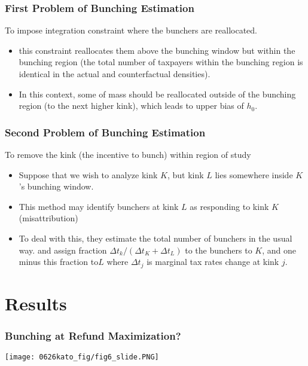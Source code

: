 \documentclass[unicode,12pt]{beamer}
\begin{document}
    \begin{frame}
        \frametitle{First Problem of Bunching Estimation}
    
        To impose integration constraint where the bunchers are reallocated.
        \begin{itemize}
            \item this constraint reallocates them above the bunching window but within the bunching region (the total number of taxpayers within the bunching region is identical in the actual and counterfactual densities).
            \item In this context, some of mass should be reallocated outside of the bunching region (to the next higher kink), which leads to upper bias of $h_0$.
        \end{itemize}
    
    \end{frame}

    \begin{frame}
        \frametitle{Second Problem of Bunching Estimation}
    
        To remove the kink (the incentive to bunch) within region of study 
        \begin{itemize}
            \item Suppose that we wish to analyze kink $K$, but kink $L$ lies somewhere inside $K$'s bunching window.
            \item This method may identify bunchers at kink $L$ as responding to kink $K$ (misattribution)
            \item To deal with this, they estimate the total number of bunchers in the usual way. and assign fraction $\Delta t_k/(\Delta t_K + \Delta t_L)$ to the bunchers to $K$, and one minus this fraction to$L$ where $\Delta t_j$ is marginal tax rates change at kink $j$.  
        \end{itemize}
    
    \end{frame}

    
    \section{Results}

    \begin{frame}
        \frametitle{Bunching at Refund Maximization?}
    
        \centerline{\texttt{[image: 0626kato\_fig/fig6\_slide.PNG]}}
    
    \end{frame}
\end{document}
